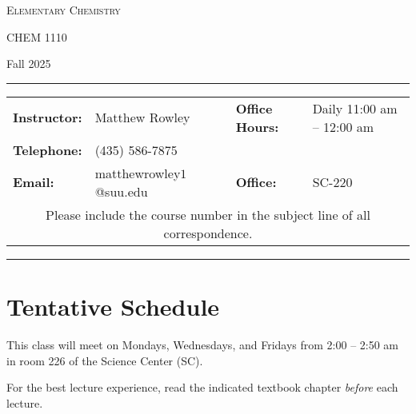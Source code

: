 \documentclass[12pt, letterpaper]{article}
\begin{document}
\begin{center}
	{\Large \textsc{Elementary Chemistry}}
	
	CHEM 1110
\end{center}

\begin{center}
	{\large Fall 2025}
\end{center}
\begin{center}
	\rule{0.99\textwidth}{0.4pt}
	\begin{tabular}{llcll}
		\textbf{Instructor:} & Matthew Rowley           &  & \textbf{Office Hours:} & Daily 11:00 am -- 12:00 am \\
		\textbf{Telephone:}  & (435) 586-7875           &  &                        &  \\
		\textbf{Email:}      & matthewrowley$1$@suu.edu &  & \textbf{Office:}       & SC-220                   \\
		\multicolumn{5}{c}{Please include the course number in the subject line of all correspondence.}
	\end{tabular}
	\rule{0.99\textwidth}{0.4pt}
\end{center}

\section*{Tentative Schedule}
This class will meet on Mondays, Wednesdays, and Fridays from 2:00  -- 2:50 am in room 226 of the Science Center (SC).


\noindent For the best lecture experience, read the indicated textbook chapter \emph{before} each lecture.
\end{document}
